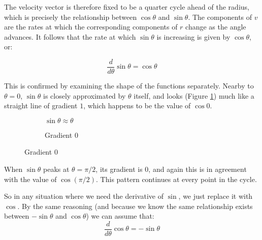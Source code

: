 The velocity vector is therefore fixed to be a quarter cycle ahead of the radius, which is precisely the relationship between $\cos \theta$ and $\sin \theta$. The components of $v$ are the rates at which the corresponding components of $r$ change as the angle advances. It follows that the rate at which $\sin \theta$ is increasing is given by $\cos \theta$, or:

$$
\frac{d}{d\theta} \sin \theta = \cos \theta
$$

This is confirmed by examining the shape of the functions separately. Nearby to $\theta = 0$, $\sin \theta$ is closely approximated by $\theta$ itself, and looks (Figure \ref{fig:sin-small}) much like a straight line of gradient $1$, which happens to be the value of $\cos 0$.

\begin{figure}[h]    
    \caption{Gradients of Sine}
    \begin{subfigure}{0.5\textwidth}
        \centering
    \caption{$\sin \theta \approx \theta$} \label{fig:sin-small}
    \end{subfigure}
    \begin{subfigure}{0.5\textwidth}
        \centering
        \caption{Gradient $0$} \label{fig:sin-peak}
    \end{subfigure}

\end{figure}

When $\sin \theta$ peaks at $\theta = \pi/2$, its gradient is $0$, and again this is in agreement with the value of $\cos (\pi/2)$. This pattern continues at every point in the cycle.

So in any situation where we need the derivative of $\sin$, we just replace it with $\cos$. By the same reasoning (and because we know the same relationship exists between $-\sin \theta$ and $\cos \theta$) we can assume that:
$$
\frac{d}{d\theta} \cos \theta = -\sin \theta
$$

